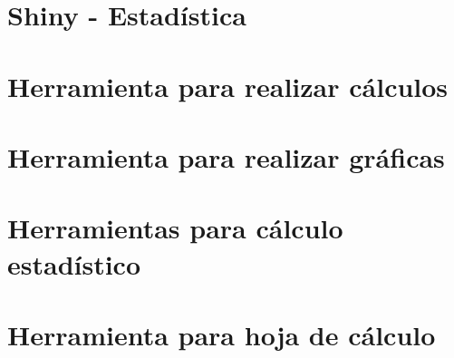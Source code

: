 \documentclass[
]{book}
\begin{document}
\section{Shiny - Estadística}\label{shiny---estaduxedstica}

\section{Herramienta para realizar cálculos}\label{herramienta-para-realizar-cuxe1lculos}

\section{Herramienta para realizar gráficas}\label{herramienta-para-realizar-gruxe1ficas}

\section{Herramientas para cálculo estadístico}\label{herramientas-para-cuxe1lculo-estaduxedstico}

\label{ggb-element4}

\section{Herramienta para hoja de cálculo}\label{herramienta-para-hoja-de-cuxe1lculo}

\label{ggb-element1}

  
\end{document}
